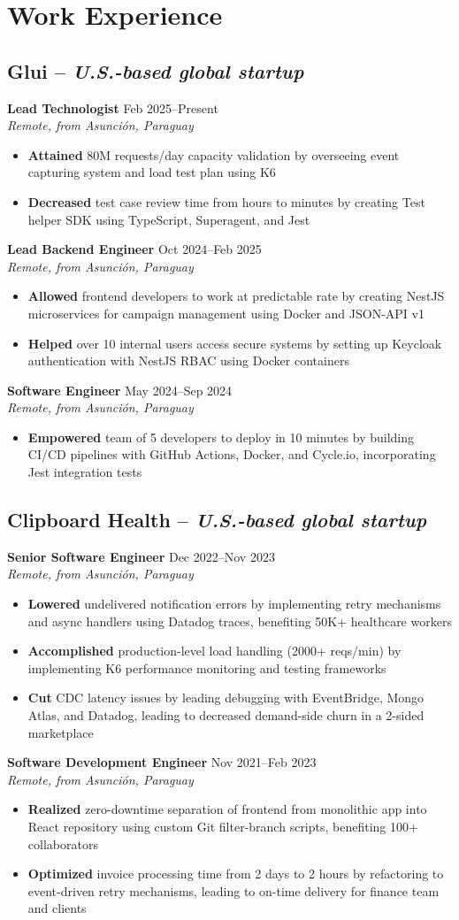 \documentclass[11pt,a4paper]{article}
\newcommand{\actionverb}[1]{\textcolor{actioncolor}{\textbf{#1}}}
\newcommand{\cvcompany}[3]{
  \subsection{#1 \textcolor{mediumgray}{#2}}
  #3
}
\newcommand{\cvrole}[4]{
  \textbf{#1} \hfill \textcolor{mediumgray}{\small #2}\\
  \textit{#3}
  \begin{itemize}
    #4
  \end{itemize}
  \vspace{1em}
}
\begin{document}
\section{Work Experience}

\cvcompany{Glui}{-- \textit{U.S.-based global startup}}{
  \cvrole{Lead Technologist}{Feb 2025--Present}{Remote, from Asunción, Paraguay}{
    \item \actionverb{Attained} 80M requests/day capacity validation by overseeing event capturing system and load test plan using K6
    \item \actionverb{Decreased} test case review time from hours to minutes by creating Test helper SDK using TypeScript, Superagent, and Jest
  }
  
  \cvrole{Lead Backend Engineer}{Oct 2024--Feb 2025}{Remote, from Asunción, Paraguay}{
    \item \actionverb{Allowed} frontend developers to work at predictable rate by creating NestJS microservices for campaign management using Docker and JSON-API v1
    \item \actionverb{Helped} over 10 internal users access secure systems by setting up Keycloak authentication with NestJS RBAC using Docker containers
  }
  
  \cvrole{Software Engineer}{May 2024--Sep 2024}{Remote, from Asunción, Paraguay}{
    \item \actionverb{Empowered} team of 5 developers to deploy in 10 minutes by building CI/CD pipelines with GitHub Actions, Docker, and Cycle.io, incorporating Jest integration tests
  }
}

\cvcompany{Clipboard Health}{-- \textit{U.S.-based global startup}}{
  \cvrole{Senior Software Engineer}{Dec 2022--Nov 2023}{Remote, from Asunción, Paraguay}{
    \item \actionverb{Lowered} undelivered notification errors by implementing retry mechanisms and async handlers using Datadog traces, benefiting 50K+ healthcare workers
    \item \actionverb{Accomplished} production-level load handling (2000+ reqs/min) by implementing K6 performance monitoring and testing frameworks
    \item \actionverb{Cut} CDC latency issues by leading debugging with EventBridge, Mongo Atlas, and Datadog, leading to decreased demand-side churn in a 2-sided marketplace
  }
  
  \cvrole{Software Development Engineer}{Nov 2021--Feb 2023}{Remote, from Asunción, Paraguay}{
    \item \actionverb{Realized} zero-downtime separation of frontend from monolithic app into React repository using custom Git filter-branch scripts, benefiting 100+ collaborators
    \item \actionverb{Optimized} invoice processing time from 2 days to 2 hours by refactoring to event-driven retry mechanisms, leading to on-time delivery for finance team and clients
  }
}
\end{document}
